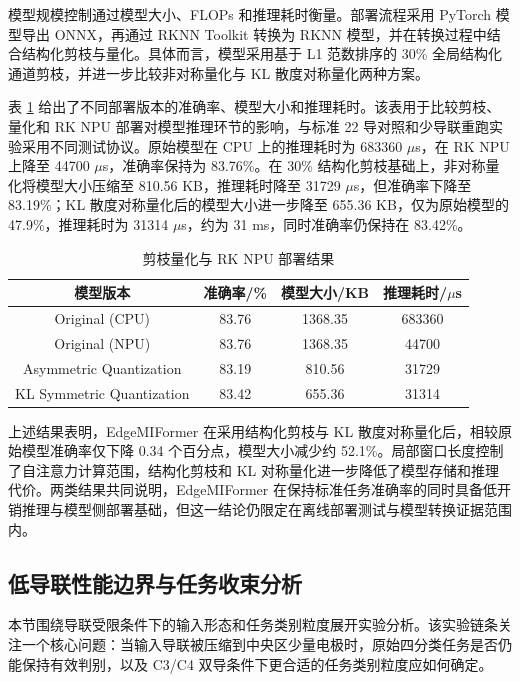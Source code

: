 模型规模控制通过模型大小、FLOPs 和推理耗时衡量。部署流程采用 PyTorch 模型导出 ONNX，再通过 RKNN Toolkit 转换为 RKNN 模型，并在转换过程中结合结构化剪枝与量化。具体而言，模型采用基于 L1 范数排序的 30\% 全局结构化通道剪枝，并进一步比较非对称量化与 KL 散度对称量化两种方案。

表 \ref{tab:chap4_deployment_result} 给出了不同部署版本的准确率、模型大小和推理耗时。该表用于比较剪枝、量化和 RK NPU 部署对模型推理环节的影响，与标准 22 导对照和少导联重跑实验采用不同测试协议。原始模型在 CPU 上的推理耗时为 683360 $\mu$s，在 RK NPU 上降至 44700 $\mu$s，准确率保持为 83.76\%。在 30\% 结构化剪枝基础上，非对称量化将模型大小压缩至 810.56 KB，推理耗时降至 31729 $\mu$s，但准确率下降至 83.19\%；KL 散度对称量化后的模型大小进一步降至 655.36 KB，仅为原始模型的 47.9\%，推理耗时为 31314 $\mu$s，约为 31 ms，同时准确率仍保持在 83.42\%。

\begin{table}[htbp]
    \centering
    \caption{剪枝量化与 RK NPU 部署结果}
    \label{tab:chap4_deployment_result}
    \begin{tabular}{cccc}
        \hline
        模型版本 & 准确率/\% & 模型大小/KB & 推理耗时/$\mu$s \\
        \hline
        Original (CPU) & 83.76 & 1368.35 & 683360 \\
        Original (NPU) & 83.76 & 1368.35 & 44700 \\
        Asymmetric Quantization & 83.19 & 810.56 & 31729 \\
        KL Symmetric Quantization & 83.42 & 655.36 & 31314 \\
        \hline
    \end{tabular}
\end{table}

上述结果表明，EdgeMIFormer 在采用结构化剪枝与 KL 散度对称量化后，相较原始模型准确率仅下降 0.34 个百分点，模型大小减少约 52.1\%。局部窗口长度控制了自注意力计算范围，结构化剪枝和 KL 对称量化进一步降低了模型存储和推理代价。两类结果共同说明，EdgeMIFormer 在保持标准任务准确率的同时具备低开销推理与模型侧部署基础，但这一结论仍限定在离线部署测试与模型转换证据范围内。

\subsection{低导联性能边界与任务收束分析}
本节围绕导联受限条件下的输入形态和任务类别粒度展开实验分析。该实验链条关注一个核心问题：当输入导联被压缩到中央区少量电极时，原始四分类任务是否仍能保持有效判别，以及 C3/C4 双导条件下更合适的任务类别粒度应如何确定。

